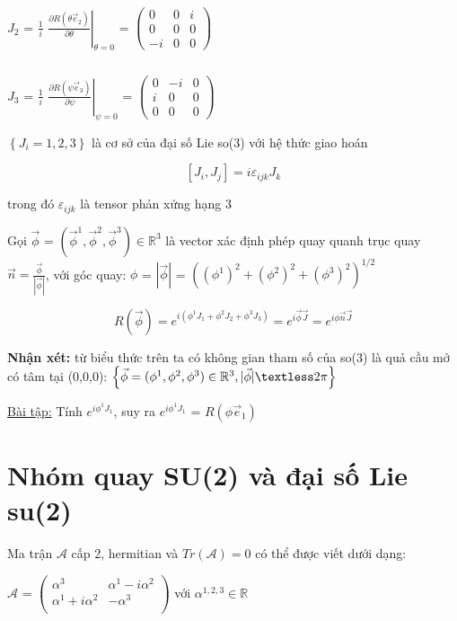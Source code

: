\documentclass{report}
\begin{document}
\[\]

\(J_{2}\) = \( \frac{1}{i} \) \( \left. { \frac{ \partial R(\theta \vec{e}_{2}) }{\partial \theta} } \right|_{\theta = 0} \) = \( \begin{pmatrix}
	0 & 0 & i \\
	0 & 0 & 0 \\
	-i & 0 & 0
	\end{pmatrix} \)	

\[\]

\(J_{3}\) = \( \frac{1}{i} \) \( \left. { \frac{ \partial R(\psi \vec{e}_{3}) }{\partial \psi} } \right|_{\psi = 0} \) = \( \begin{pmatrix}
	0 & -i & 0 \\
	i & 0 & 0 \\
	0 & 0 & 0
	\end{pmatrix} \)
	
\( \left\lbrace { J_{i} = 1, 2, 3 } \right\rbrace \) là cơ sở của đại số Lie so(3) với hệ thức giao hoán

\[ [J_{i}, J_{j}] = i \varepsilon_{ijk}J_{k} \]

trong đó  \( \varepsilon_{ijk} \) là tensor phản xứng hạng 3

Gọi \(\vec{\phi}\) = \( ( \vec{\phi}^{1}, \vec{\phi}^{2}, \vec{\phi}^{3} ) \in \mathbb{R}^{3} \) là vector xác định phép quay quanh trục quay \( \vec{n} = \frac{\vec{\phi}}{|\vec{\phi}|} \), với góc quay: \(\phi\) = \( |\vec{\phi}| \) = \( ( (\phi^{1})^{2} + (\phi^{2})^{2} + (\phi^{3})^{2} )^{1/2} \) 

\[ R(\vec{\phi}) = e^{i( \phi^{1} J_{1} + \phi^{2} J_{2} + \phi^{3} J_{3} )} = e^{i \vec{\phi} \vec{J}} = e^{i \phi \vec{n} \vec{J} } \]

\textbf{Nhận xét:} từ biểu thức trên ta có không gian tham số của so(3) là quả cầu mở có tâm tại (0,0,0): \( \left\lbrace { \vec{\phi} = ( \phi^{1}, \phi^{2}, \phi^{3}) \in \mathbb{R}^{3}, |\vec{\phi}| \textless 2 \pi }  \right\rbrace \)
	
\underline{Bài tập:} Tính \( e^{i \phi^{1} J_{1} }\), suy ra \( e^{i \phi^{1} J_{1}} \) = \( R(\phi \vec{e}_{1}) \)	

\section{Nhóm quay SU(2) và đại số Lie su(2) }
Ma trận \( \mathcal{A} \) cấp 2, hermitian và \(Tr(\mathcal{A}) = 0\) có thể được viết dưới dạng:
	
\( \mathcal{A} \) = \( \begin{pmatrix}
	\alpha^{3} & \alpha^{1} - i \alpha^{2} \\
	\alpha^{1} + i \alpha^{2} & - \alpha^{3} \\
	\end{pmatrix} \)  với \( \alpha^{1, 2, 3} \in \mathbb{R} \)
\end{document}
